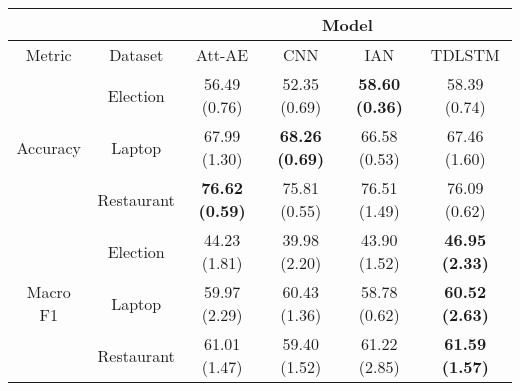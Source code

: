\begin{tabular}{|c|c|c|c|c|c|}
\hline
&  &        \multicolumn{4}{c|}{Model} \\
\hline
Metric & Dataset &     Att-AE &           CNN &           IAN &        TDLSTM   \\
\hline
\multirow{3}{*}{Accuracy} & Election & 56.49 (0.76) &  52.35 (0.69) &  \textbf{58.60 (0.36)} &  58.39 (0.74) \\
& Laptop &  67.99 (1.30) & \textbf{ 68.26 (0.69)} &  66.58 (0.53) &  67.46 (1.60) \\
& Restaurant &  \textbf{76.62 (0.59)} &  75.81 (0.55) &  76.51 (1.49) &  76.09 (0.62) \\
\hline
\multirow{3}{*}{Macro F1} & Election &  44.23 (1.81) &  39.98 (2.20) &  43.90 (1.52) &  \textbf{46.95 (2.33)} \\
& Laptop &  59.97 (2.29) &  60.43 (1.36) &  58.78 (0.62) &  \textbf{60.52 (2.63)} \\
& Restaurant &  61.01 (1.47) &  59.40 (1.52) &  61.22 (2.85) &  \textbf{61.59 (1.57)} \\
\hline
\end{tabular}
